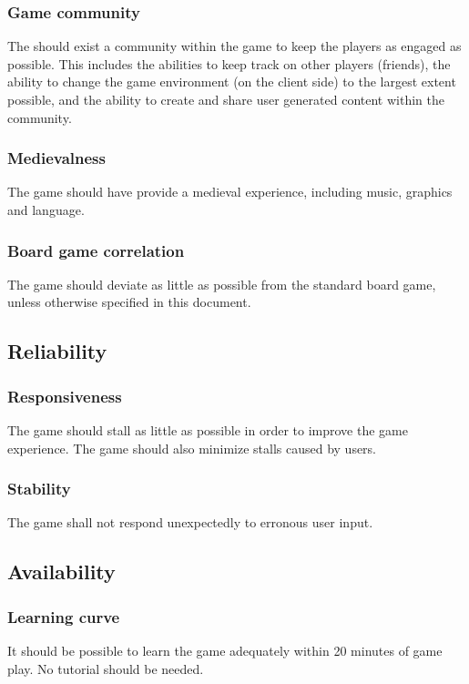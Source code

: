 \documentclass[a4paper,10pt]{article}
\begin{document}
\subsubsection{Game community}
The should exist a community within the game to keep the players as engaged as possible. This includes the abilities to keep track on other players (friends), the ability to change the game environment (on the client side) to the largest extent possible, and the ability to create and share user generated content within the community.

\subsubsection{Medievalness}
The game should have provide a medieval experience, including music, graphics and language.

\subsubsection{Board game correlation}
The game should deviate as little as possible from the standard board game, unless otherwise specified in this document.

\subsection{Reliability}
\subsubsection{Responsiveness}
The game should stall as little as possible in order to improve the game experience. The game should also minimize stalls caused by users.

\subsubsection{Stability}
The game shall not respond unexpectedly to erronous user input.

\subsection{Availability}
\subsubsection{Learning curve}
It should be possible to learn the game adequately within 20 minutes of game play. No tutorial should be needed.
\end{document}
